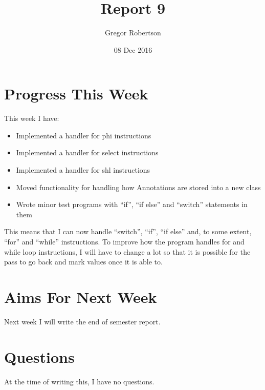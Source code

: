 \documentclass{article}
\title{Report 9}
\author{Gregor Robertson}
\date{08 Dec 2016}
\begin{document}
 
\maketitle
 
\section*{Progress This Week}
This week I have:
\begin{itemize}
	\item Implemented a handler for phi instructions
	\item Implemented a handler for select instructions
	\item Implemented a handler for shl instructions
	\item Moved functionality for handling how Annotations are stored into a new class
	\item Wrote minor test programs with ``if'', ``if else'' and ``switch'' statements in them
\end{itemize}
This means that I can now handle ``switch'', ``if'', ``if else'' and, to some extent, ``for'' and ``while'' instructions. To improve how the program handles for and while loop instructions, I will have to change a lot so that it is possible for the pass to go back and mark values once it is able to.  

\section*{Aims For Next Week}
Next week I will write the end of semester report. 

\section*{Questions}
At the time of writing this, I have no questions. 

\medskip
 
\printbibliography
\end{document}
